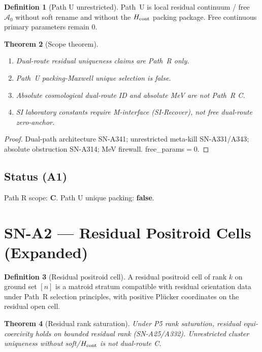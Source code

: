 \documentclass[11pt,a4paper]{article}
\newtheorem{theorem}{Theorem}[section]
\theoremstyle{definition}
\newtheorem{definition}[theorem]{Definition}
\begin{document}
\begin{definition}[Path U unrestricted]
\label{def:A1-pathU}
Path~U is local residual continuum / free $\mathcal{A}_0$ without soft rename and without
the $H_{\rm cont}$ packing package. Free continuous primary parameters remain $0$.
\end{definition}

\begin{theorem}[Scope theorem]
\label{thm:A1-scope}
\begin{enumerate}[label=(\roman*)]
\item Dual-route residual uniqueness claims are Path~R only.
\item Path~U packing-Maxwell unique selection is false.
\item Absolute cosmological dual-route ID and absolute MeV are not Path~R C.
\item SI laboratory constants require M-interface (SI-Recover), not free dual-route zero-anchor.
\end{enumerate}
\end{theorem}

\begin{proof}
Dual-path architecture SN-A341; unrestricted meta-kill SN-A331/A343; absolute obstruction SN-A314;
MeV firewall. free\_params${=}0$.
\end{proof}

\subsection*{Status (A1)} Path R scope: \textbf{C}. Path U unique packing: \textbf{false}.

\section{SN-A2 --- Residual Positroid Cells (Expanded)}
\label{sec:SNA2}

\begin{definition}[Residual positroid cell]
\label{def:A2-cell}
A residual positroid cell of rank $k$ on ground set $[n]$ is a matroid stratum compatible
with residual orientation data under Path~R selection principles, with positive Pl\"ucker
coordinates on the residual open cell.
\end{definition}

\begin{theorem}[Residual rank saturation]
\label{thm:A2-rank}
Under P5 rank saturation, residual equi-coercivity holds on bounded residual rank
(SN-A25/A332). Unrestricted cluster uniqueness without soft/$H_{\rm cont}$ is not dual-route C.
\end{theorem}
\end{document}
